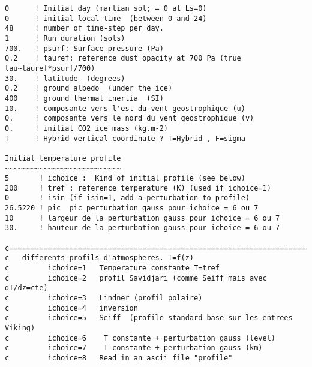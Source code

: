 {\footnotesize
\begin{verbatim}
0      ! Initial day (martian sol; = 0 at Ls=0) 
0      ! initial local time  (between 0 and 24) 
48     ! number of time-step per day.
1      ! Run duration (sols) 
700.   ! psurf: Surface pressure (Pa) 
0.2    ! tauref: reference dust opacity at 700 Pa (true tau~tauref*psurf/700)
30.    ! latitude  (degrees) 
0.2    ! ground albedo  (under the ice)
400    ! ground thermal inertia  (SI)
10.    ! composante vers l'est du vent geostrophique (u) 
0.     ! composante vers le nord du vent geostrophique (v)
0.     ! initial CO2 ice mass (kg.m-2)
T      ! Hybrid vertical coordinate ? T=Hybrid , F=sigma

Initial temperature profile
~~~~~~~~~~~~~~~~~~~~~~~~~~~
5       ! ichoice :  Kind of initial profile (see below)
200     ! tref : reference temperature (K) (used if ichoice=1)
0       ! isin (if isin=1, add a perturbation to profile)
26.5220 ! pic  pic perturbation gauss pour ichoice = 6 ou 7
10      ! largeur de la perturbation gauss pour ichoice = 6 ou 7
30.     ! hauteur de la perturbation gauss pour ichoice = 6 ou 7 

c=======================================================================
c   differents profils d'atmospheres. T=f(z)
c         ichoice=1   Temperature constante T=tref
c         ichoice=2   profil Savidjari (comme Seiff mais avec dT/dz=cte)
c         ichoice=3   Lindner (profil polaire)
c         ichoice=4   inversion
c         ichoice=5   Seiff  (profile standard base sur les entrees Viking)
c         ichoice=6    T constante + perturbation gauss (level)
c         ichoice=7    T constante + perturbation gauss (km)
c         ichoice=8   Read in an ascii file "profile" 

\end{verbatim}
}
